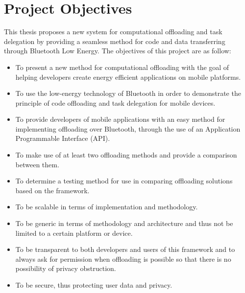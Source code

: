 \section{Project Objectives}
\label{objectives}

This thesis proposes a new system for computational offloading and task delegation by providing a seamless method for code and data transferring through Bluetooth Low Energy. The objectives of this project are as follow:

\begin{itemize}

\item{To present a new method for computational offloading with the goal of helping developers create energy efficient applications on mobile platforms.}

\item{To use the low-energy technology of Bluetooth in order to demonstrate the principle of code offloading and task delegation for mobile devices.}

\item{To provide developers of mobile applications with an easy method for implementing offloading over Bluetooth, through the use of an Application Programmable Interface (API). }

\item{To make use of at least two offloading methods and provide a comparison between them.}

\item{To determine a testing method for use in comparing offloading solutions based on the framework.}

\item{To be scalable in terms of implementation and methodology.}

\item{To be generic in terms of methodology and architecture and thus not be limited to a certain platform or device.}

\item{To be transparent to both developers and users of this framework and to always ask for permission when offloading is possible so that there is no possibility of privacy obstruction.}

\item{To be secure, thus protecting user data and privacy.}

\end{itemize}




